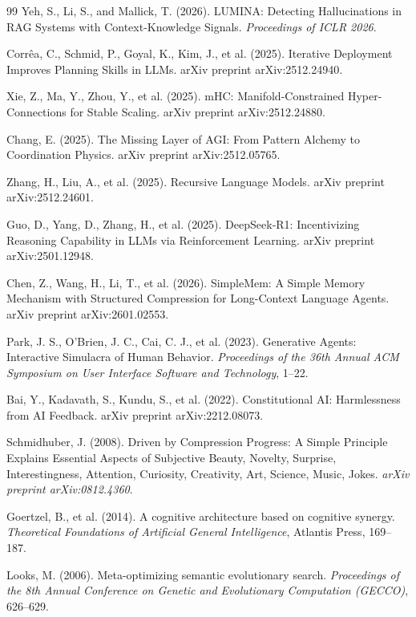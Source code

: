 \documentclass[11pt,a4paper]{article}
\begin{document}
\begin{thebibliography}{99}
Yeh, S., Li, S., and Mallick, T. (2026).
LUMINA: Detecting Hallucinations in RAG Systems with Context-Knowledge Signals.
\textit{Proceedings of ICLR 2026}.

Corr\^ea, C., Schmid, P., Goyal, K., Kim, J., et al. (2025).
Iterative Deployment Improves Planning Skills in LLMs.
arXiv preprint arXiv:2512.24940.

Xie, Z., Ma, Y., Zhou, Y., et al. (2025).
mHC: Manifold-Constrained Hyper-Connections for Stable Scaling.
arXiv preprint arXiv:2512.24880.

Chang, E. (2025).
The Missing Layer of AGI: From Pattern Alchemy to Coordination Physics.
arXiv preprint arXiv:2512.05765.

Zhang, H., Liu, A., et al. (2025).
Recursive Language Models.
arXiv preprint arXiv:2512.24601.

Guo, D., Yang, D., Zhang, H., et al. (2025).
DeepSeek-R1: Incentivizing Reasoning Capability in LLMs via Reinforcement Learning.
arXiv preprint arXiv:2501.12948.

Chen, Z., Wang, H., Li, T., et al. (2026).
SimpleMem: A Simple Memory Mechanism with Structured Compression for Long-Context Language Agents.
arXiv preprint arXiv:2601.02553.

Park, J. S., O'Brien, J. C., Cai, C. J., et al. (2023).
Generative Agents: Interactive Simulacra of Human Behavior.
\textit{Proceedings of the 36th Annual ACM Symposium on User Interface Software and Technology}, 1--22.

Bai, Y., Kadavath, S., Kundu, S., et al. (2022).
Constitutional AI: Harmlessness from AI Feedback.
arXiv preprint arXiv:2212.08073.

Schmidhuber, J. (2008).
Driven by Compression Progress: A Simple Principle Explains Essential Aspects of Subjective Beauty, Novelty, Surprise, Interestingness, Attention, Curiosity, Creativity, Art, Science, Music, Jokes.
\textit{arXiv preprint arXiv:0812.4360}.

Goertzel, B., et al. (2014).
A cognitive architecture based on cognitive synergy.
\textit{Theoretical Foundations of Artificial General Intelligence}, Atlantis Press, 169--187.

Looks, M. (2006).
Meta-optimizing semantic evolutionary search.
\textit{Proceedings of the 8th Annual Conference on Genetic and Evolutionary Computation (GECCO)}, 626--629.


\end{thebibliography}
\end{document}
